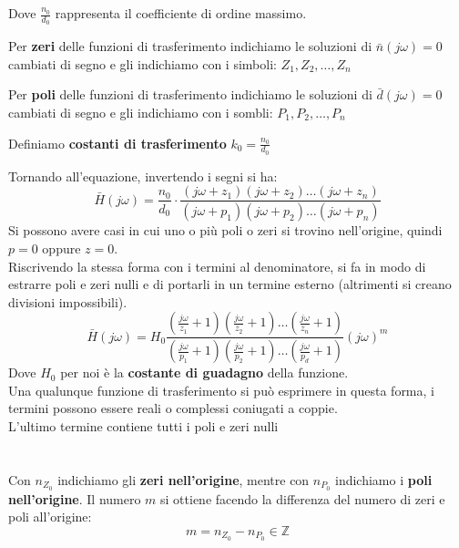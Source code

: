 \documentclass[../main.tex]{subfiles}
\begin{document}
	Dove $\frac{n_0}{d_0}$ rappresenta il coefficiente di ordine massimo.
	\begin{definition}
		Per \textbf{zeri} delle funzioni di trasferimento indichiamo le soluzioni di $\bar n (j \omega) = 0$ cambiati di segno e gli indichiamo con i simboli: $Z_1, Z_2, \dots , Z_n$
	\end{definition}
	\begin{definition}
		Per \textbf{poli} delle funzioni di trasferimento indichiamo le soluzioni di $\bar d (j \omega) = 0$ cambiati di segno e gli indichiamo con i sombli: $P_1, P_2, \dots , P_n$
	\end{definition}
	\begin{definition}
		Definiamo \textbf{costanti di trasferimento} $k_0 = \frac{n_0}{d_0}$
	\end{definition}
	Tornando all'equazione, invertendo i segni si ha:
	\begin{equation}
		\bar H(j\omega) = \frac{n_0}{d_0} \cdot \frac{(j\omega + z_1)(j\omega + z_2) \dots (j\omega + z_n)}{(j\omega + p_1)(j\omega + p_2)\dots(j\omega + p_n)}	
	\end{equation}
	Si possono avere casi in cui uno o più poli o zeri si trovino nell'origine, quindi $p=0$ oppure $z=0$. \\
	Riscrivendo la stessa forma con i termini al denominatore, si fa in modo di estrarre poli e zeri nulli e di portarli in un termine esterno (altrimenti si creano divisioni impossibili).
	\begin{equation} \label{eq-stramba}
		\bar H(j\omega) = H_0 \frac{\left(\frac{j\omega}{z_1}+1\right)\left(\frac{j\omega}{z_2}+1\right)\dots\left(\frac{j\omega}{z_n}+1\right)}{\left(\frac{j\omega}{p_1}+1\right)\left(\frac{j\omega}{p_2}+1\right)\dots\left(\frac{j\omega}{p_d}+1\right)}(j\omega )^m
	\end{equation}
	Dove $H_0$ per noi è la \textbf{costante di guadagno} della funzione.\\
	Una qualunque funzione di trasferimento si può esprimere in questa forma, i termini possono essere reali o complessi coniugati a coppie.\\
	L'ultimo termine contiene tutti i poli e zeri nulli\\\\\\
	Con $n_{Z_0}$ indichiamo gli \textbf{zeri nell'origine}, mentre con $n_{P_0}$ indichiamo i \textbf{poli nell'origine}.
	Il numero $m$ si ottiene facendo la differenza del numero di zeri e poli all'origine:
	\begin{equation}
		m = n_{Z_0} - n_{P_0} \in \mathbb{Z}
	\end{equation}
\end{document}
